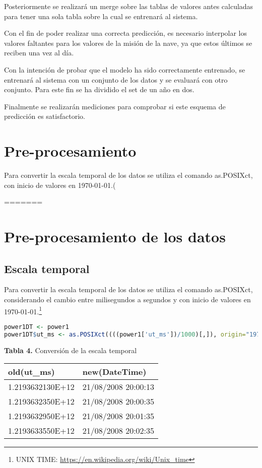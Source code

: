 \documentclass[../Main.tex]{subfiles}
\begin{document}
Posteriormente se realizará un merge sobre las tablas de valores antes calculadas para tener una sola tabla sobre la cual se entrenará al sistema. 

Con el fin de poder realizar una correcta predicción, es necesario interpolar los valores faltantes para los valores de la misión de la nave, ya que estos últimos se reciben una vez al día.

Con la intención de probar que el modelo ha sido correctamente entrenado, se entrenará al sistema con un conjunto de los datos y se evaluará con otro conjunto. Para este fin se ha dividido el set de un año en dos.

Finalmente se realizarán mediciones para comprobar si este esquema de predicción es satisfactorio.

\section{Pre-procesamiento}
Para convertir la escala temporal de los datos se utiliza el comando as.POSIXct, con inicio de valores en 1970-01-01.(%

=======
\section{Pre-procesamiento de los datos}
\subsection{Escala temporal}
Para convertir la escala temporal de los datos se utiliza el comando as.POSIXct, considerando el cambio entre milisegundos a segundos y con inicio de valores en 1970-01-01.\footnote{UNIX TIME: \url{https://en.wikipedia.org/wiki/Unix_time}} 

\begin{lstlisting}[language=R]
power1DT <- power1
power1DT$ut_ms <- as.POSIXct((((power1['ut_ms'])/1000)[,]), origin="1970-01-01")
\end{lstlisting}

\begin{center}
\textbf{Tabla 4.} Conversión de la escala temporal\\
\begin{tabular}{|l|l|}
\hline
old(ut\_ms)           & new(DateTime)            \\ \hline
1.2193632130E+12 & 21/08/2008 20:00:13 \\ \hline
1.2193632350E+12 & 21/08/2008 20:00:35 \\ \hline
1.2193632950E+12 & 21/08/2008 20:01:35 \\ \hline
1.2193633550E+12 & 21/08/2008 20:02:35 \\ \hline
\end{tabular}
\end{center}
\end{document}
